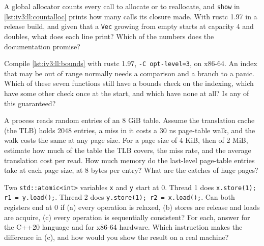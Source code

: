 \begin{question}\label{iq:iv3:low-latency:17}
A global allocator counts every call to allocate or to reallocate, and \texttt{show} in \cref{lst:iv3:ll:countalloc} prints how many calls its closure made. With rustc 1.97 in a release build, and given that a \texttt{Vec} growing from empty starts at capacity 4 and doubles, what does each line print? Which of the numbers does the documentation promise?
\label{lst:iv3:ll:countalloc}
\end{question}

\begin{question}\label{iq:iv3:low-latency:18}
Compile \cref{lst:iv3:ll:bounds} with rustc 1.97, \texttt{-C opt-level=3}, on x86-64. An index that may be out of range normally needs a comparison and a branch to a panic. Which of these seven functions still have a bounds check on the indexing, which have some other check once at the start, and which have none at all? Is any of this guaranteed?
\label{lst:iv3:ll:bounds}
\end{question}

\begin{question}\label{iq:iv3:low-latency:19}
A process reads random entries of an 8 GiB table. Assume the translation cache (the TLB) holds 2048 entries, a miss in it costs a 30 ns page-table walk, and the walk costs the same at any page size. For a page size of 4 KiB, then of 2 MiB, estimate how much of the table the TLB covers, the miss rate, and the average translation cost per read. How much memory do the last-level page-table entries take at each page size, at 8 bytes per entry? What are the catches of huge pages?
\end{question}

\begin{question}\label{iq:iv3:low-latency:20}
Two \texttt{std::atomic<int>} variables \texttt{x} and \texttt{y} start at 0. Thread 1 does \texttt{x.store(1); r1 = y.load();}. Thread 2 does \texttt{y.store(1); r2 = x.load();}. Can both registers end at 0 if (a) every operation is relaxed, (b) stores are release and loads are acquire, (c) every operation is sequentially consistent? For each, answer for the C++20 language and for x86-64 hardware. Which instruction makes the difference in (c), and how would you show the result on a real machine?
\end{question}

